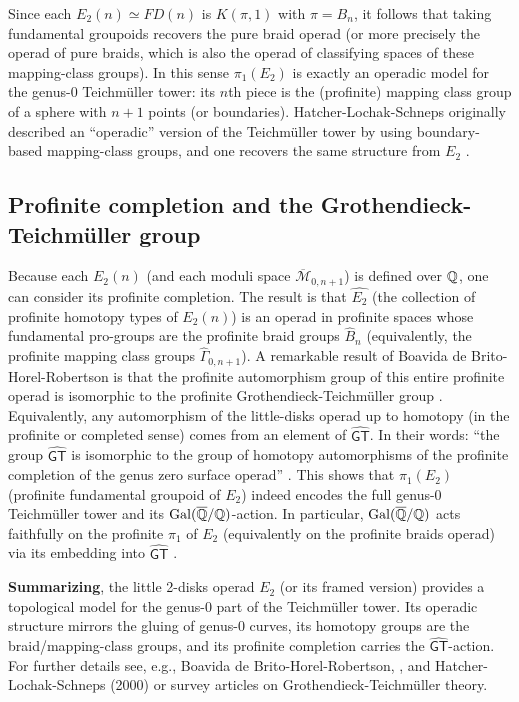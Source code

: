 Since each $E_2(n)\simeq FD(n)$ is $K(\pi,1)$ with $\pi=B_n$, it follows that taking fundamental groupoids recovers the pure braid operad (or more precisely the operad of pure braids, which is also the operad of classifying spaces of these mapping-class groups).  In this sense $\pi_1(E_2)$ is exactly an operadic model for the genus-0 Teichm\"uller tower: its $n$th piece is the (profinite) mapping class group of a sphere with $n+1$ points (or boundaries).  Hatcher-Lochak-Schneps originally described an “operadic” version of the Teichm\"uller tower by using boundary-based mapping-class groups, and one recovers the same structure from $E_2$ \cite{Borghi_Robertson_2025} \cite{de_Brito_Horel_Robertson_2019}.

\subsection{Profinite completion and the Grothendieck-Teichm\"uller group}

Because each $E_2(n)$ (and each moduli space $\overline{\mathcal{M}}_{0,n+1}$) is defined over $\mathbb{Q}$, one can consider its profinite completion.  The result is that $\widehat{E_2}$ (the collection of profinite homotopy types of $E_2(n)$) is an operad in profinite spaces whose fundamental pro-groups are the profinite braid groups $\widehat B_n$ (equivalently, the profinite mapping class groups $\widehat\Gamma_{0,n+1}$).  A remarkable result of Boavida de Brito-Horel-Robertson is that the profinite automorphism group of this entire profinite operad is isomorphic to the profinite Grothendieck-Teichm\"uller group \cite{de_Brito_Horel_Robertson_2019}. Equivalently, any automorphism of the little-disks operad up to homotopy (in the profinite or completed sense) comes from an element of $\widehat{\mathsf{GT}}$. In their words: “the group $\widehat{\mathsf{GT}}$ is isomorphic to the group of homotopy automorphisms of the profinite completion of the genus zero surface operad” \cite{de_Brito_Horel_Robertson_2019}. This shows that $\pi_1(E_2)$ (profinite fundamental groupoid of $E_2$) indeed encodes the full genus-0 Teichm\"uller tower and its $\mathrm{Gal}(\overline{\mathbb{Q}}/\mathbb{Q})$-action.  In particular, $\mathrm{Gal}(\overline{\mathbb{Q}}/\mathbb{Q})$ acts faithfully on the profinite $\pi_1$ of $E_2$ (equivalently on the profinite braids operad) via its embedding into $\widehat{\mathsf{GT}}$ \cite{de_Brito_Horel_Robertson_2019}.

\textbf{Summarizing}, the little 2-disks operad $E_2$ (or its framed version) provides a topological model for the genus-0 part of the Teichm\"uller tower.  Its operadic structure mirrors the gluing of genus-0 curves, its homotopy groups are the braid/mapping-class groups, and its profinite completion carries the $\widehat{\mathsf{GT}}$-action.  For further details see, e.g., Boavida de Brito-Horel-Robertson, \cite{de_Brito_Horel_Robertson_2019}, and Hatcher-Lochak-Schneps (2000) or survey articles on Grothendieck-Teichm\"uller theory.

